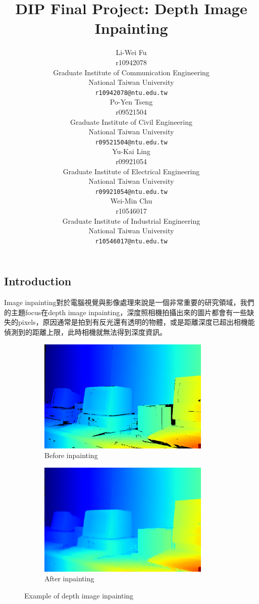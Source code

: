 \documentclass{article}
\title{DIP Final Project: Depth Image Inpainting}
\author{%
  Li-Wei Fu\\
  r10942078\\
  Graduate Institute of Communication Engineering\\
  National Taiwan University\\
  \texttt{r10942078@ntu.edu.tw} \\
  \And
  Po-Yen Tseng \\
  r09521504\\
  Graduate Institute of Civil Engineering\\
  National Taiwan University \\
  \texttt{r09521504@ntu.edu.tw}\\ 
  \And
  Yu-Kai Ling \\
  r09921054 \\
  Graduate Institute of Electrical Engineering\\
  National Taiwan University\\
  \texttt{r09921054@ntu.edu.tw} \\
  \And
  Wei-Min Chu\\
  r10546017\\
  Graduate Institute of Industrial Engineering\\
  National Taiwan University\\
  \texttt{r10546017@ntu.edu.tw} \\
}
\begin{document}
\begin{CJK*}{UTF8}{bkai}
\maketitle

\renewcommand{\baselinestretch}{1.50}\normalsize
\section{Introduction}
Image inpainting\cite{inpainting}對於電腦視覺與影像處理來說是一個非常重要的研究領域，我們的主題focus在depth image inpainting，深度照相機拍攝出來的圖片都會有一些缺失的pixels，原因通常是拍到有反光還有透明的物體，或是距離深度已超出相機能偵測到的距離上限，此時相機就無法得到深度資訊。

\begin{figure}[h]
    \centering
    \begin{subfigure}[h]{0.45\textwidth}
        \centering
        \includegraphics[width=0.9\textwidth]{imgs/image_inpaint.png}
        \caption{Before inpainting}
        \label{fig:image_inpainting_a}
    \end{subfigure}
    \begin{subfigure}[h]{0.45\textwidth}
        \centering
        \includegraphics[width=0.9\textwidth]{imgs/image_inpaint2.png}
        \caption{After inpainting}
    \label{fig:image_inpainting_b}
    \end{subfigure}
    \caption{Example of depth image inpainting}
    \label{fig:image_inpainting}
\end{figure}




\end{CJK*}
\end{document}
